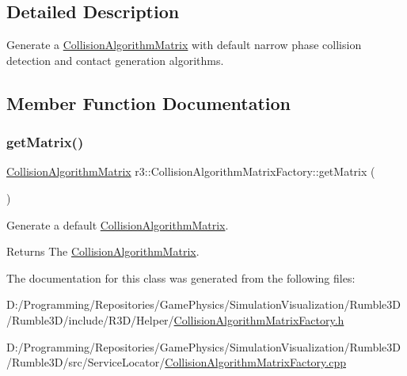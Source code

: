 \subsection{Detailed Description}
Generate a \mbox{\hyperlink{classr3_1_1_collision_algorithm_matrix}{Collision\+Algorithm\+Matrix}} with default narrow phase collision detection and contact generation algorithms. 

\subsection{Member Function Documentation}
\mbox{\label{classr3_1_1_collision_algorithm_matrix_factory_a236c7063f66f29284fb1c008c402b043}} 
\subsubsection{\texorpdfstring{get\+Matrix()}{getMatrix()}}
{\footnotesize\ttfamily \mbox{\hyperlink{classr3_1_1_collision_algorithm_matrix}{Collision\+Algorithm\+Matrix}} r3\+::\+Collision\+Algorithm\+Matrix\+Factory\+::get\+Matrix (\begin{DoxyParamCaption}{ }\end{DoxyParamCaption})\hspace{0.3cm}{\ttfamily [static]}}



Generate a default \mbox{\hyperlink{classr3_1_1_collision_algorithm_matrix}{Collision\+Algorithm\+Matrix}}. 

\begin{DoxyReturn}{Returns}
The \mbox{\hyperlink{classr3_1_1_collision_algorithm_matrix}{Collision\+Algorithm\+Matrix}}. 
\end{DoxyReturn}


The documentation for this class was generated from the following files\+:\begin{DoxyCompactItemize}
\item 
D\+:/\+Programming/\+Repositories/\+Game\+Physics/\+Simulation\+Visualization/\+Rumble3\+D/\+Rumble3\+D/include/\+R3\+D/\+Helper/\mbox{\hyperlink{_collision_algorithm_matrix_factory_8h}{Collision\+Algorithm\+Matrix\+Factory.\+h}}\item 
D\+:/\+Programming/\+Repositories/\+Game\+Physics/\+Simulation\+Visualization/\+Rumble3\+D/\+Rumble3\+D/src/\+Service\+Locator/\mbox{\hyperlink{_collision_algorithm_matrix_factory_8cpp}{Collision\+Algorithm\+Matrix\+Factory.\+cpp}}\end{DoxyCompactItemize}
